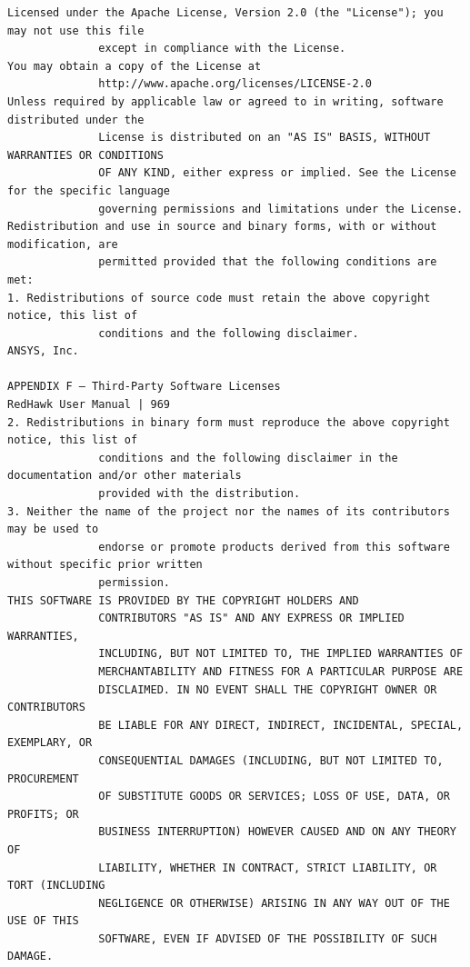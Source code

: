 \begin{lstlisting}[basicstyle=\ttfamily\scriptsize,breaklines=true]
Licensed under the Apache License, Version 2.0 (the "License"); you may not use this file
              except in compliance with the License.
You may obtain a copy of the License at
              http://www.apache.org/licenses/LICENSE-2.0
Unless required by applicable law or agreed to in writing, software distributed under the
              License is distributed on an "AS IS" BASIS, WITHOUT WARRANTIES OR CONDITIONS
              OF ANY KIND, either express or implied. See the License for the specific language
              governing permissions and limitations under the License.
Redistribution and use in source and binary forms, with or without modification, are
              permitted provided that the following conditions are met:
1. Redistributions of source code must retain the above copyright notice, this list of
              conditions and the following disclaimer.
ANSYS, Inc.

APPENDIX F — Third-Party Software Licenses                                   RedHawk User Manual | 969
2. Redistributions in binary form must reproduce the above copyright notice, this list of
              conditions and the following disclaimer in the documentation and/or other materials
              provided with the distribution.
3. Neither the name of the project nor the names of its contributors may be used to
              endorse or promote products derived from this software without specific prior written
              permission.
THIS SOFTWARE IS PROVIDED BY THE COPYRIGHT HOLDERS AND
              CONTRIBUTORS "AS IS" AND ANY EXPRESS OR IMPLIED WARRANTIES,
              INCLUDING, BUT NOT LIMITED TO, THE IMPLIED WARRANTIES OF
              MERCHANTABILITY AND FITNESS FOR A PARTICULAR PURPOSE ARE
              DISCLAIMED. IN NO EVENT SHALL THE COPYRIGHT OWNER OR CONTRIBUTORS
              BE LIABLE FOR ANY DIRECT, INDIRECT, INCIDENTAL, SPECIAL, EXEMPLARY, OR
              CONSEQUENTIAL DAMAGES (INCLUDING, BUT NOT LIMITED TO, PROCUREMENT
              OF SUBSTITUTE GOODS OR SERVICES; LOSS OF USE, DATA, OR PROFITS; OR
              BUSINESS INTERRUPTION) HOWEVER CAUSED AND ON ANY THEORY OF
              LIABILITY, WHETHER IN CONTRACT, STRICT LIABILITY, OR TORT (INCLUDING
              NEGLIGENCE OR OTHERWISE) ARISING IN ANY WAY OUT OF THE USE OF THIS
              SOFTWARE, EVEN IF ADVISED OF THE POSSIBILITY OF SUCH DAMAGE.
\end{lstlisting}

